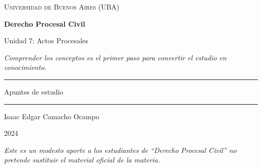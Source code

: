 \documentclass[12pt,oneside]{book}
\newcommand{\universidad}{Universidad de Buenos Aires (UBA)}
\newcommand{\materia}{Derecho Procesal Civil}
\newcommand{\titulo}{Unidad 7: Actos Procesales}
\newcommand{\autor}{Isaac Edgar Camacho Ocampo}
\newcommand{\anio}{2024}
\begin{document}
\begin{titlepage}

\thispagestyle{empty}

\begin{center}

\vspace*{1cm}

{\large \textsc{\universidad}}

\vspace{3cm}

{\Huge \textbf{\materia}}

\vspace{1cm}

{\LARGE \titulo}

\vspace{0.8cm}

\textit{Comprender los conceptos es el primer paso para convertir el estudio en conocimiento.}

\vspace{1.2cm}

\rule{0.70\textwidth}{0.5pt}

\vspace{0.5cm}

{\large Apuntes de estudio}

\vspace{0.5cm}

\rule{0.70\textwidth}{0.5pt}

\vfill

{\large \autor}

\vspace{0.3cm}

{\large \anio}

\end{center}

\vfill

\begin{flushleft}
\textit{Este es un modesto aporte a los estudiantes de ``Derecho Procesal Civil'' no pretende sustituir el material oficial de la materia.}
\end{flushleft}

\end{titlepage}

\tableofcontents
\clearpage

\end{document}
